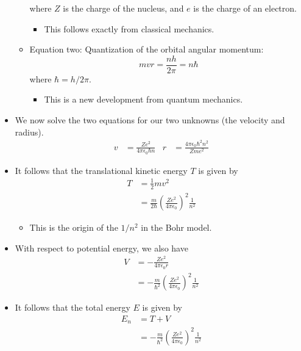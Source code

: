 \documentclass[../notes.tex]{subfiles}
\begin{document}
\begin{itemize}
\begin{itemize}
\begin{equation*}
        \end{equation*}
        where $Z$ is the charge of the nucleus, and $e$ is the charge of an electron.
        \begin{itemize}
            \item This follows exactly from classical mechanics.
        \end{itemize}
        \item Equation two: Quantization of the orbital angular momentum:
        \begin{equation*}
            mvr = \frac{nh}{2\pi} = n\hbar
        \end{equation*}
        where $\hbar=h/2\pi$.
        \begin{itemize}
            \item This is a new development from quantum mechanics.
        \end{itemize}
    \end{itemize}
    \item We now solve the two equations for our two unknowns (the velocity and radius).
    \begin{align*}
        v &= \frac{Ze^2}{4\pi\epsilon_0\hbar n}&
        r &= \frac{4\pi\epsilon_0\hbar^2n^2}{Zme^2}
    \end{align*}
    \item It follows that the translational kinetic energy $T$ is given by
    \begin{align*}
        T &= \frac{1}{2}mv^2\\
        &= \frac{m}{2\hbar}\left( \frac{Ze^2}{4\pi\epsilon_0} \right)^2\frac{1}{n^2}
    \end{align*}
    \begin{itemize}
        \item This is the origin of the $1/n^2$ in the Bohr model.
    \end{itemize}
    \item With respect to potential energy, we also have
    \begin{align*}
        V &= -\frac{Ze^2}{4\pi\epsilon_0r}\\
        &= -\frac{m}{\hbar^2}\left( \frac{Ze^2}{4\pi\epsilon_0} \right)^2\frac{1}{n^2}
    \end{align*}
    \item It follows that the total energy $E$ is given by
    \begin{align*}
        E_n &= T+V\\
        &= -\frac{m}{\hbar^2}\left( \frac{Ze^2}{4\pi\epsilon_0} \right)^2\frac{1}{n^2}

\end{align*}
\end{itemize}
\end{document}
